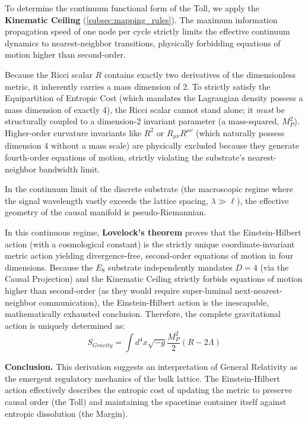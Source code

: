 To determine the continuum functional form of the Toll, we apply the \textbf{Kinematic Ceiling} (\cref{subsec:mapping_rules}). The maximum information propagation speed of one node per cycle strictly limits the effective continuum dynamics to nearest-neighbor transitions, physically forbidding equations of motion higher than second-order. 

Because the Ricci scalar $R$ contains exactly two derivatives of the dimensionless metric, it inherently carries a mass dimension of 2. To strictly satisfy the Equipartition of Entropic Cost (which mandates the Lagrangian density possess a mass dimension of exactly 4), the Ricci scalar cannot stand alone; it \textit{must} be structurally coupled to a dimension-2 invariant parameter (a mass-squared, $M_P^2$). Higher-order curvature invariants like $R^2$ or $R_{\mu\nu}R^{\mu\nu}$ (which naturally possess dimension 4 without a mass scale) are physically excluded because they generate fourth-order equations of motion, strictly violating the substrate's nearest-neighbor bandwidth limit.

In the continuum limit of the discrete substrate (the macroscopic regime where the signal wavelength vastly exceeds the lattice spacing, $\lambda \gg \ell$), the effective geometry of the causal manifold is pseudo-Riemannian. 

In this continuous regime, \textbf{Lovelock's theorem} \cite{lovelock_einstein_1971} proves that the Einstein-Hilbert action (with a cosmological constant) is the strictly unique coordinate-invariant metric action yielding divergence-free, second-order equations of motion in four dimensions. Because the $E_8$ substrate independently mandates $D=4$ (via the Causal Projection) and the Kinematic Ceiling strictly forbids equations of motion higher than second-order (as they would require super-luminal next-nearest-neighbor communication), the Einstein-Hilbert action is the inescapable, mathematically exhausted conclusion. Therefore, the complete gravitational action is uniquely determined as:
\begin{equation}
    S_{Gravity} = \int d^4x \sqrt{-g} \frac{M_P^2}{2} (R - 2\Lambda)
\end{equation}

\textbf{Conclusion.} This derivation suggests an interpretation of General Relativity as the emergent regulatory mechanics of the bulk lattice. The Einstein-Hilbert action effectively describes the entropic cost of updating the metric to preserve causal order (the Toll) and maintaining the spacetime container itself against entropic dissolution (the Margin).

